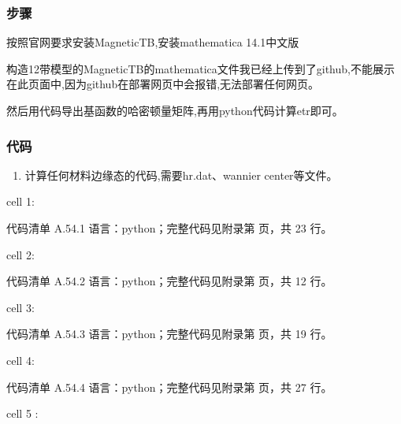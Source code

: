 \documentclass[lang=cn,scheme=chinese,color=blue,device=normal,toc=onecol,math=cm]{elegantbook}
\begin{document}
\subsubsection{步骤}


按照官网要求安装MagneticTB,安装mathematica 14.1中文版\par


构造12带模型的MagneticTB的mathematica文件我已经上传到了github,不能展示在此页面中,因为github在部署网页中会报错,无法部署任何网页。\par


然后用代码导出基函数的哈密顿量矩阵,再用python代码计算etr即可。\par


\subsubsection{代码}


\begin{enumerate}
\item 计算任何材料边缘态的代码,需要hr.dat、wannier center等文件。
\end{enumerate}


cell 1:\par


\begin{codeindexbox}{代码清单 A.54.1}
语言：python；完整代码见附录第 \pageref{code:54:1} 页，共 23 行。
\end{codeindexbox}


cell 2:\par


\begin{codeindexbox}{代码清单 A.54.2}
语言：python；完整代码见附录第 \pageref{code:54:2} 页，共 12 行。
\end{codeindexbox}


cell 3:\par


\begin{codeindexbox}{代码清单 A.54.3}
语言：python；完整代码见附录第 \pageref{code:54:3} 页，共 19 行。
\end{codeindexbox}


cell 4:\par


\begin{codeindexbox}{代码清单 A.54.4}
语言：python；完整代码见附录第 \pageref{code:54:4} 页，共 27 行。
\end{codeindexbox}


cell 5 :\par
\end{document}
